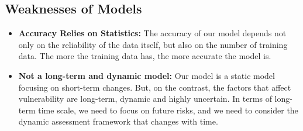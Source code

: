\documentclass{mcmthesis}
\begin{document}
\subsection{Weaknesses of Models}
\begin{itemize}
  \item \textbf{Accuracy Relies on Statistics:} The accuracy of our model 
  depends not only on the reliability of the data itself, but also on the 
  number of training data. The more the training data has, 
  the more accurate the model is.
  \item \textbf{Not a long-term and dynamic model:} Our model is a static 
  model focusing on short-term changes. But, on the contrast, the factors 
  that affect vulnerability are long-term, dynamic and highly uncertain. 
  In terms of long-term time scale, we need to focus on future risks, and 
  we need to consider the dynamic assessment framework that changes with time. 
\end{itemize}


\end{document}
